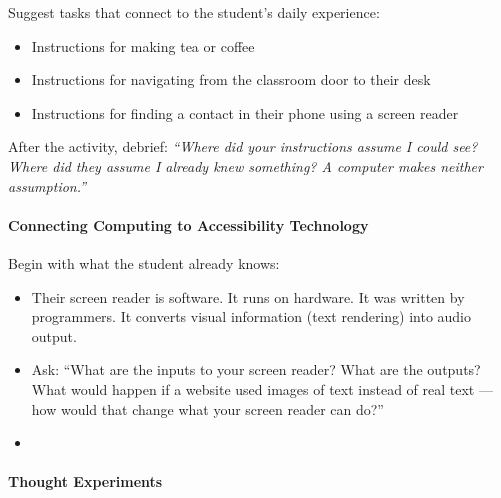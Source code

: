 \documentclass[
  justified,
  openright,
]{tufte-book}
\let\paragraph\paragraph
\let\paragraph\paragraph
\providecommand{\tightlist}{%
  \setlength{\itemsep}{0pt}\setlength{\parskip}{0pt}}
\begin{document}
Suggest tasks that connect to the student's daily experience:

\begin{itemize}
\tightlist
\item
  Instructions for making tea or coffee
\item
  Instructions for navigating from the classroom door to their desk
\item
  Instructions for finding a contact in their phone using a screen
  reader
\end{itemize}

After the activity, debrief: \emph{``Where did your instructions assume
I could see? Where did they assume I already knew something? A computer
makes neither assumption.''}

\paragraph{Connecting Computing to Accessibility
Technology}\label{connecting-computing-to-accessibility-technology}

Begin with what the student already knows:

\begin{itemize}
\tightlist
\item
  Their screen reader is software. It runs on hardware. It was written
  by programmers. It converts visual information (text rendering) into
  audio output.
\item
  Ask: ``What are the inputs to your screen reader? What are the
  outputs? What would happen if a website used images of text instead of
  real text --- how would that change what your screen reader can do?''
\item
  
\end{itemize}

\paragraph{Thought Experiments}\label{thought-experiments-4}
\end{document}
